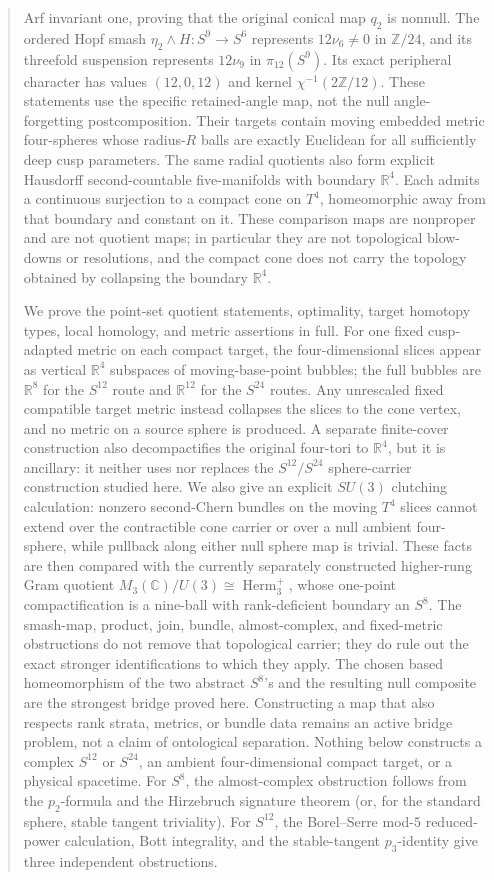 \documentclass[11pt,letterpaper]{article}
\numberwithin{equation}{section}
\theoremstyle{definition}
\theoremstyle{remark}
\newcommand{\R}{\mathbb R}
\newcommand{\C}{\mathbb C}
\begin{document}
\begin{abstract}
Arf invariant one, proving that the original conical map \(q_2\)
is nonnull. The ordered Hopf smash \(\eta_2\wedge H:S^9\to S^6\)
represents \(12\nu_6\ne0\) in \(\mathbb Z/24\), and its
threefold suspension represents \(12\nu_9\) in \(\pi_{12}(S^9)\).
Its exact peripheral character has values \((12,0,12)\) and kernel
\(\chi^{-1}(2\mathbb Z/12)\). These statements use the specific
retained-angle map, not the null angle-forgetting postcomposition.
Their targets contain moving embedded metric four-spheres whose
radius-\(R\) balls are exactly Euclidean for all sufficiently deep cusp
parameters.  The same radial quotients also form explicit Hausdorff
second-countable five-manifolds with boundary \(\R^4\).  Each admits a
continuous surjection to a compact cone on \(T^4\), homeomorphic away from
that boundary and constant on it.  These comparison maps are nonproper and
are not quotient maps; in particular they are not topological blow-downs or
resolutions, and the compact cone does not carry the topology obtained by
collapsing the boundary \(\R^4\).

We prove the point-set quotient statements, optimality, target homotopy
types, local homology, and metric assertions in full.  For one fixed
cusp-adapted metric on each compact target, the four-dimensional slices
appear as vertical \(\R^4\) subspaces of moving-base-point bubbles; the
full bubbles are \(\R^8\) for the \(S^{12}\) route and \(\R^{12}\) for
the \(S^{24}\) routes.  Any unrescaled fixed compatible target metric
instead collapses the slices to the cone vertex, and no metric on a source
sphere is produced.  A separate finite-cover construction also
decompactifies the original four-tori to \(\R^4\), but it is ancillary:
it neither uses nor replaces the \(S^{12}/S^{24}\) sphere-carrier
construction studied here.  We also give an explicit \(SU(3)\) clutching
calculation: nonzero second-Chern bundles on the moving \(T^4\) slices
cannot extend over the contractible cone carrier or over a null ambient
four-sphere, while pullback along either null sphere map is trivial.  These
facts are then compared with the currently separately constructed
higher-rung Gram quotient
\(M_3(\C)/U(3)\cong\operatorname{Herm}_3^+\), whose one-point
compactification is a nine-ball with rank-deficient boundary an \(S^8\).
The smash-map, product, join, bundle, almost-complex, and fixed-metric
obstructions do not remove that topological carrier; they do rule out
the exact stronger identifications to which they apply.  The chosen based
homeomorphism of the two abstract \(S^8\)'s and the resulting null composite
are the strongest bridge proved here.  Constructing a map that also respects
rank strata, metrics, or bundle data remains an active bridge problem, not
a claim of ontological separation.  Nothing below constructs a complex
\(S^{12}\) or \(S^{24}\), an ambient four-dimensional compact target, or
a physical spacetime.  For \(S^8\), the almost-complex obstruction follows
from the \(p_2\)-formula and the Hirzebruch signature theorem (or, for the
standard sphere, stable tangent triviality).  For \(S^{12}\), the Borel--Serre
mod-\(5\) reduced-power calculation, Bott integrality, and the
stable-tangent \(p_3\)-identity give three independent obstructions.
\end{abstract}
\end{document}
